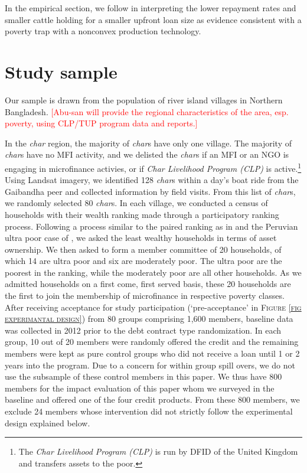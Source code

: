 	In the empirical section, we follow \citet{BandieraBRAC2017} in interpreting the lower repayment rates and smaller cattle holding for a smaller upfront loan size as evidence consistent with a poverty trap with a nonconvex production technology. 

\section{Study sample}
\label{SecStudySample}

	Our sample is drawn from the population of river island villages in Northern Bangladesh. 
	\textcolor{red}{[Abu-san will provide the regional characteristics of the area, esp. poverty, using CLP/TUP program data and reports.]}
	
	In the \textit{char} region, the majority of \textit{char}s have only one village. The majority of \textit{char}s have no MFI activity, and we delisted the \textit{char}s if an MFI or an NGO is engaging in microfinance activies, or if \textit{Char Livelihood Program (CLP)} is active.\footnote{The \textit{Char Livelihood Program (CLP)} is run by DFID of the United Kingdom and transfers assets to the poor. } Using Landsat imagery, we identified 128 \textit{char}s within a day's boat ride from the Gaibandha peer and collected information by field visits. From this list of \textit{char}s, we randomly selected 80 \textit{char}s. In each village, we conducted a census of households with their wealth ranking made through a participatory ranking process. Following a process similar to the paired ranking as in \citet[][p.1212]{Alatas2012} and the Peruvian ultra poor case of \citet[][p.66]{KarlanThuysbaert2019}, we asked the least wealthy households in terms of asset ownership. We then asked to form a member committee of 20 households, of which 14 are ultra poor and six are moderately poor. The ultra poor are the poorest in the ranking, while the moderately poor are all other households. As we admitted households on a first come, first served basis, these 20 households are the first to join the membership of microfinance in respective poverty classes. After receiving acceptance for study participation (`pre-acceptance' in \textsc{\normalsize Figure \ref{fig experimantal design}}) from 80 groups comprising 1,600 members, baseline data was collected in 2012 prior to the debt contract type randomization. In each group, 10 out of 20 members were randomly offered the credit and the remaining members were kept as pure control groups who did not receive a loan until 1 or 2 years into the program. Due to a concern for within group spill overs, we do not use the subsample of these control members in this paper. We thus have 800 members for the impact evaluation of this paper whom we surveyed in the baseline and offered one of the four credit products. From these 800 members, we exclude 24 members whose intervention did not strictly follow the experimental design explained below.

